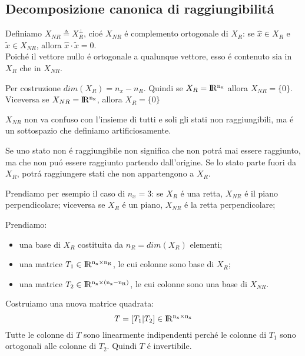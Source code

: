 \documentclass[../main.tex]{subfiles}
\begin{document}
	\subsection{Decomposizione canonica di raggiungibilit\'a}		
		Definiamo $ X_{NR} \triangleq X_R^{\perp} $, cio\'e $ X_{NR} $ \'e complemento ortogonale di $ X_R $: se $ \hat x \in X_R $ e $ \tilde x \in X_{NR} $, allora $ \hat x \cdot \tilde x = 0 $.\\
		Poich\'e il vettore nullo \'e ortogonale a qualunque vettore, esso \'e contenuto sia in $ X_R $ che in $ X_{NR} $.
		\newline
		
		Per costruzione $ dim\left( X_R \right) = n_x - n_R $. Quindi se $ X_R = \rm I\!R^{n_x} $ allora $ X_{NR} = \{0\} $. Viceversa se $ X_{NR} = \rm I\!R^{n_x} $, allora $ X_R = \{0\} $
		\newline
		
		$ X_{NR} $ non va confuso con l'insieme di tutti e soli gli stati non raggiungibili, ma \'e un sottospazio che definiamo artificiosamente.
		\newline
		
		Se uno stato non \'e raggiungibile non significa che non potr\'a mai essere raggiunto, ma che non pu\'o essere raggiunto partendo dall'origine. Se lo stato parte fuori da $ X_R $, potr\'a raggiungere stati che non appartengono a $ X_R $.
		\newline
		
		Prendiamo per esempio il caso di $ n_x = 3 $: se $ X_R $ \'e una retta, $ X_{NR} $ \'e il piano perpendicolare; viceversa se $ X_R $ \'e un piano, $ X_{NR} $ \'e la retta perpendicolare;
		\newline
		
		Prendiamo:
		\begin{itemize}
			\item
				una base di $ X_R $ costituita da $ n_R = dim(X_R) $ elementi;
			\item
				una matrice $ T_1 \in \rm I\!R^{n_x \times n_R} $, le cui colonne sono base di $ X_R $;
			\item
				una matrice $ T_2 \in \rm I\!R^{n_x \times (n_x - n_R)} $, le cui colonne sono una base di $ X_{NR} $.
		\end{itemize}
	
		Costruiamo una nuova matrice quadrata:
		\[ T = \left[ T_1 | T_2 \right] \in \rm I\!R^{n_x \times n_x} \]
		Tutte le colonne di $ T $ sono linearmente indipendenti perch\'e le colonne di $ T_1 $ sono ortogonali alle colonne di $ T_2 $. Quindi $ T $ \'e invertibile.
		
\end{document}
